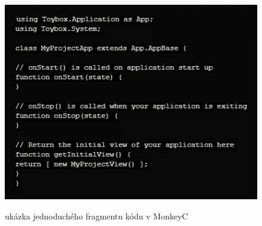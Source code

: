 \begin{figure}
	\centering
	\includegraphics{images/code_snippet}
	\\
	\caption{ukázka jednoduchého fragmentu kódu v MonkeyC}
	\label{img:monkeyC_Fragment}
\end{figure}

